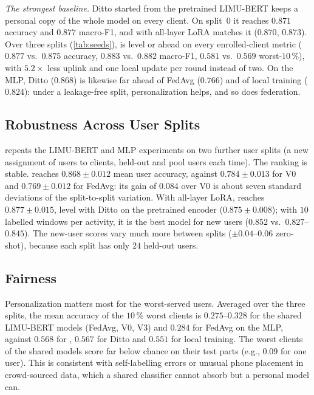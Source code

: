 \emph{The strongest baseline.} Ditto started from the pretrained LIMU-BERT keeps a personal copy of the
whole model on every client. On split~$0$ it reaches $0.871$ accuracy and $0.877$ macro-F1, and
\method{} with all-layer LoRA matches it ($0.870$, $0.873$). Over three splits (\cref{tab:seeds}),
\method{} is level or ahead on every enrolled-client metric ($0.877$ vs.\ $0.875$ accuracy, $0.883$ vs.\
$0.882$ macro-F1, $0.581$ vs.\ $0.569$ worst-$10\,\%$), with $5.2\times$ less uplink and one local update per
round instead of two. On the MLP, Ditto ($0.868$) is likewise far ahead of FedAvg ($0.766$) and of local
training ($0.824$): under a leakage-free split, personalization helps, and so does federation.

\subsection{Robustness Across User Splits}\label{sec:results:seeds}

 repeats the LIMU-BERT and MLP experiments on two further user splits (a new
assignment of users to clients, held-out and pool users each time). The ranking is stable. \method{}
reaches $0.868\pm0.012$ mean user accuracy, against $0.784\pm0.013$ for V0 and $0.769\pm0.012$ for
FedAvg: its gain of $0.084$ over V0 is about seven standard deviations of the split-to-split
variation. With all-layer LoRA, \method{} reaches $0.877\pm0.015$, level with Ditto on the pretrained
encoder ($0.875\pm0.008$); with $10$ labelled windows per activity, it is the best model for new users
($0.852$ vs.\ $0.827$--$0.845$). The new-user scores vary much more between splits ($\pm0.04$--$0.06$
zero-shot), because each split has only $24$ held-out users.

\subsection{Fairness}\label{sec:results:fairness}

Personalization matters most for the worst-served users. Averaged over the three splits, the mean
accuracy of the $10\,\%$ worst clients is $0.275$--$0.328$ for the shared LIMU-BERT models (FedAvg, V0,
V3) and $0.284$ for FedAvg on the MLP, against $0.568$ for \method{}, $0.567$ for Ditto and $0.551$ for
local training. The worst clients of the shared models score far below chance on their test parts
(e.g., $0.09$ for one user). This is consistent with self-labelling errors or unusual phone placement in
crowd-sourced data, which a shared classifier cannot absorb but a personal model can.

